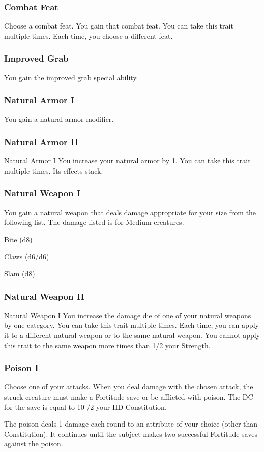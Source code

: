 \subsubsection{Combat Feat}
Choose a combat feat.
\featben You gain that combat feat.
 You can take this trait multiple times. Each time, you choose a different feat.

\subsubsection{Improved Grab}
\featben You gain the improved grab special ability. 

\subsubsection{Natural Armor I}
\featben You gain a  natural armor modifier.

\subsubsection{Natural Armor II}
\featpre Natural Armor I
\featben You increase your natural armor by 1.
 You can take this trait multiple times. Its effects stack.

\subsubsection{Natural Weapon I}
\featben You gain a natural weapon that deals damage appropriate for your size from the following list. The damage listed is for Medium creatures.
\begin{itemize*}
    \item Bite (d8)
    \item Claws (d6/d6)
    \item Slam (d8)
\end{itemize*}

\subsubsection{Natural Weapon II}
\featpre Natural Weapon I
\featben You increase the damage die of one of your natural weapons by one category.
 You can take this trait multiple times. Each time, you can apply it to a different natural weapon or to the same natural weapon. You cannot apply this trait to the same weapon more times than 1/2 your Strength. 

\subsubsection{Poison I}
Choose one of your attacks.
\featben When you deal damage with the chosen attack, the struck creature must make a Fortitude save or be afflicted with poison. The DC for the save is equal to 10 /2 your HD \add Constitution.
\par The poison deals 1 damage each round to an attribute of your choice (other than Constitution). It continues until the subject makes two successful Fortitude saves against the poison.

